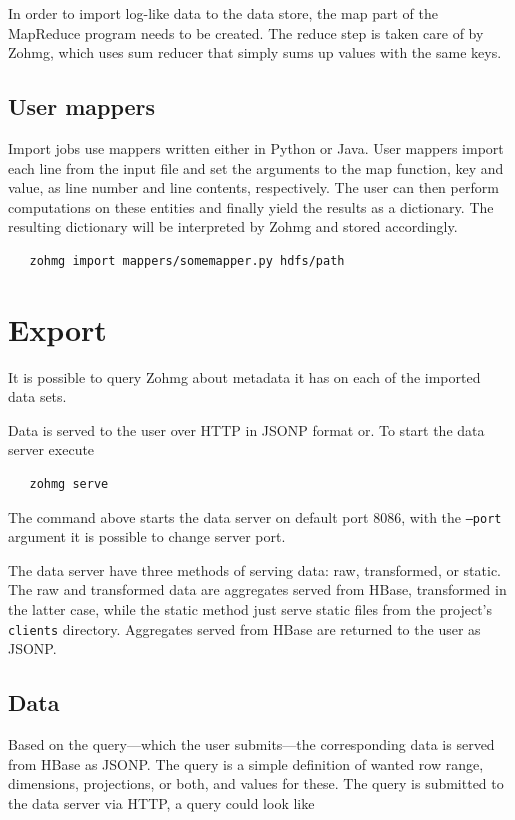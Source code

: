 In order to import log-like data to the data store, the map part of the
MapReduce program needs to be created. The reduce step is taken care of by
Zohmg, which uses sum reducer that simply sums up values with the same keys.


\subsection*{User mappers}

Import jobs use mappers written either in Python or Java. User mappers import
each line from the input file and set the arguments to the map function, key and
value, as line number and line contents, respectively. The user can then perform
computations on these entities and finally yield the results as a dictionary.
The resulting dictionary will be interpreted by Zohmg and stored accordingly.

\begin{verbatim}
   zohmg import mappers/somemapper.py hdfs/path
\end{verbatim}


\section*{Export}

It is possible to query Zohmg about metadata it has on each of the imported
data sets.

Data is served to the user over HTTP in JSONP format or. To start the data
server execute

\begin{verbatim}
   zohmg serve
\end{verbatim}

The command above starts the data server on default port 8086, with the
\texttt{--port} argument it is possible to change server port.

The data server have three methods of serving data: raw, transformed, or
static. The raw and transformed data are aggregates served from HBase,
transformed in the latter case, while the static method just serve static
files from the project's \texttt{clients} directory. Aggregates served from
HBase are returned to the user as JSONP.


\subsection*{Data}

Based on the query---which the user submits---the corresponding data is
served from HBase as JSONP. The query is a simple definition of wanted row
range, dimensions, projections, or both, and values for these. The query is
submitted to the data server via HTTP, a query could look like

